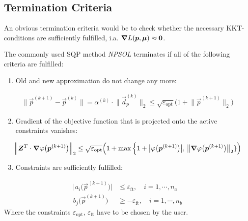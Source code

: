 		\subsection{Termination Criteria}
			An obvious termination criteria would be to check whether the necessary KKT-conditions are sufficiently fulfilled, i.a. \( \grad{L}(\bm{p}, \bm{\mu}) \approx \bm{0} \).

			The commonly used SQP method \emph{NPSOL} terminates if all of the following criteria are fulfilled:
			\begin{enumerate}
				\item Old and new approximation do not change any more:
			\end{enumerate}
			\begin{align*}
				\big\lVert \vec{p}^{(k + 1)} - \vec{p}^{(k)} \big\rVert = \alpha^{(k)} \cdot \big\lVert \vec{d}_p^{(k)} \big\rVert_2 \leq \sqrt{\varepsilon_\mathrm{opt}} \Big( 1 + \big\lVert \vec{p}^{(k + 1)} \big\rVert_2 \Big)
			\end{align*}
			\begin{enumerate}
				\setcounter{enumi}{1}
				\item Gradient of the objective function that is projected onto the active constraints vanishes:
			\end{enumerate}
			\begin{align*}
				\Big\lVert \bm{Z}^T \cdot \grad{\varphi}\big(\bm{p}^{(k + 1)}\big) \Big\rVert_2 \leq \sqrt{\varepsilon_\mathrm{opt}} \Big( 1 + \max\Big\{ 1 + \big\lvert \varphi\big(\bm{p}^{(k + 1)}\big) \big\rvert,\, \big\lVert \grad{\varphi}\big(\bm{p}^{(k + 1)}\big) \big\rVert_2 \} \Big)
			\end{align*}
			\begin{enumerate}
				\setcounter{enumi}{2}
				\item Constraints are sufficiently fulfilled:
			\end{enumerate}
			\begin{align*}
				\big\lvert a_i\big(\vec{p}^{(k + 1)}\big) \big\rvert & \leq \varepsilon_\mathrm{ft},\quad i = 1, \cdots, n_a  \\
				b_j\big(\vec{p}^{(k + 1)}\big)                       & \geq -\varepsilon_\mathrm{ft},\quad i = 1, \cdots, n_b
			\end{align*}
			Where the constraints \( \varepsilon_\mathrm{opt} \), \( \varepsilon_\mathrm{ft} \) have to be chosen by the user.

